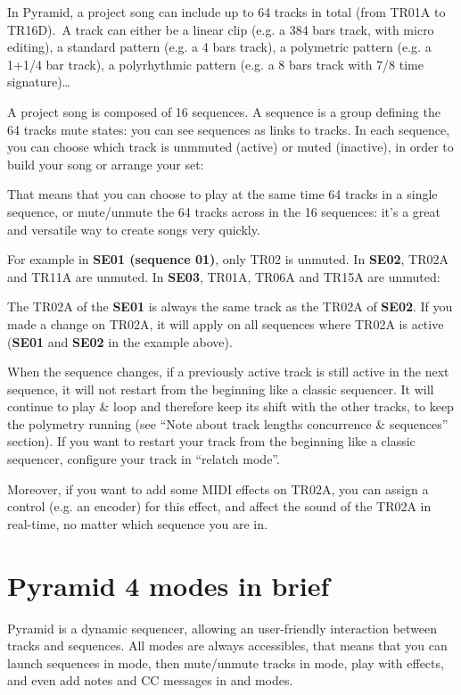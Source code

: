 In Pyramid, a project song can include up to 64 tracks in total (from TR01A to TR16D). A track can either be a linear clip (e.g. a 384 bars track, with micro editing), a standard pattern (e.g. a 4 bars track), a polymetric pattern (e.g. a 1+1/4 bar track), a polyrhythmic pattern (e.g. a 8 bars track with 7/8 time signature)…

A project song is composed of 16 sequences. A sequence is a group defining the 64 tracks mute states: you can see sequences as links to tracks. In each sequence, you can choose which track is unmmuted (active) or muted (inactive), in order to build your song or arrange your set:


That means that you can choose to play at the same time 64 tracks in a single sequence, or mute/unmute the 64 tracks across in the 16 sequences: it's a great and versatile way to create songs very quickly.

For example in \textbf{SE01 (sequence 01)}, only TR02 is unmuted. In \textbf{SE02}, TR02A and TR11A are unmuted. In \textbf{SE03}, TR01A, TR06A and TR15A are unmuted:


The TR02A of the \textbf{SE01} is always the same track as the TR02A of \textbf{SE02}. If you made a change on TR02A, it will apply on all sequences where TR02A is active (\textbf{SE01} and \textbf{SE02} in the example above).

When the sequence changes, if a previously active track is still active in the next sequence, it will not restart from the beginning like a classic sequencer. It will continue to play \& loop and therefore keep its shift with the other tracks, to keep the polymetry running (see ``Note about track lengths concurrence \& sequences'' section). If you want to restart your track from the beginning like a classic sequencer, configure your track in ``relatch mode''.

Moreover, if you want to add some MIDI effects on TR02A, you can assign a control (e.g. an encoder) for this effect, and affect the sound of the TR02A in real-time, no matter which sequence you are in.


\section{Pyramid 4 modes in brief}

Pyramid is a dynamic sequencer, allowing an user-friendly interaction between tracks and sequences. All modes are always accessibles, that means that you can launch sequences in  mode, then mute/unmute tracks in  mode, play with effects, and even add notes and CC messages in  and   modes.

